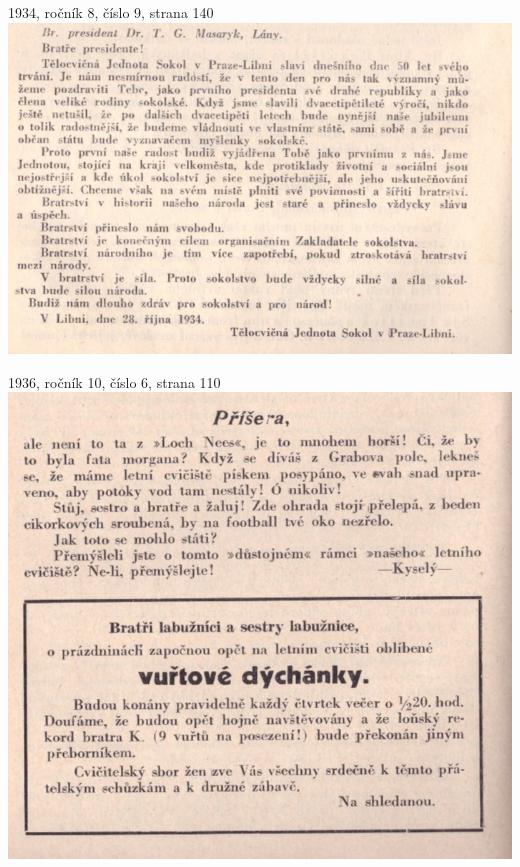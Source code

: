 \documentclass[11pt]{article}
\begin{document}
1934, ročník 8, číslo 9, strana 140 \\
\includegraphics[width=\imagewidth]{original/1934/Skener_20250325 (16).jpg}



\clearpage

1936, ročník 10, číslo 6, strana 110 \\
\includegraphics[width=\imagewidth]{original/1936/Skener_20250323 (2).jpg}
\end{document}
